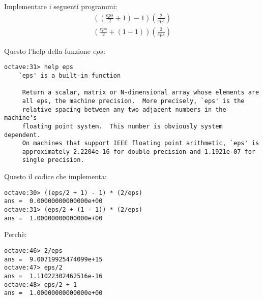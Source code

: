 \begin{exercise}[1.13]
Implementare i seguenti programmi:
\begin{displaymath}
\begin{split}
	\left ( \left ( \frac{eps}{2} + 1 \right ) - 1 \right ) \left ( \frac{2}{eps}
	\right ) \\ \left ( \frac{eps}{2}  + \left ( 1 - 1 \right ) \right ) \left (
	\frac{2}{eps} \right )
\end{split}
\end{displaymath}
\end{exercise}
Questo l'help della funzione $eps$:
\begin{lstlisting}
octave:31> help eps
	`eps' is a built-in function

     Return a scalar, matrix or N-dimensional array whose elements are
     all eps, the machine precision.  More precisely, `eps' is the
     relative spacing between any two adjacent numbers in the machine's
     floating point system.  This number is obviously system dependent.
     On machines that support IEEE floating point arithmetic, `eps' is
     approximately 2.2204e-16 for double precision and 1.1921e-07 for
     single precision.
\end{lstlisting}
Questo il codice che implementa:
\begin{lstlisting}
octave:30> ((eps/2 + 1) - 1) * (2/eps)
ans =  0.00000000000000e+00
octave:31> (eps/2 + (1 - 1)) * (2/eps)
ans =  1.00000000000000e+00
\end{lstlisting}
Perch\`e:
\begin{lstlisting}
octave:46> 2/eps
ans =  9.00719925474099e+15
octave:47> eps/2
ans =  1.11022302462516e-16
octave:48> eps/2 + 1
ans =  1.00000000000000e+00
\end{lstlisting}

